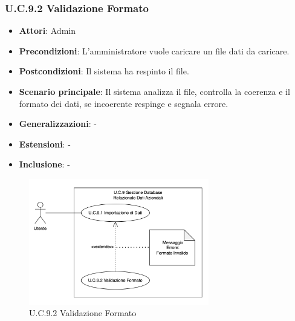 \subsubsection{U.C.9.2 Validazione Formato}
\begin{itemize}
    \item \textbf{Attori}: Admin
    \item \textbf{Precondizioni}: L’amministratore vuole caricare un file dati da caricare.
    \item \textbf{Postcondizioni}: Il sistema ha respinto il file.
    \item \textbf{Scenario principale}: Il sistema analizza il file, controlla la coerenza e il formato dei dati, se incoerente respinge e segnala errore.
    \item \textbf{Generalizzazioni}: -
    \item \textbf{Estensioni}: -
    \item \textbf{Inclusione}: -
\end{itemize}
\begin{figure}[H]
    \centering
    \includegraphics[width=0.7\textwidth]{img/U.C.9.2.png}
    \caption{U.C.9.2 Validazione Formato}
\end{figure}
\newpage

